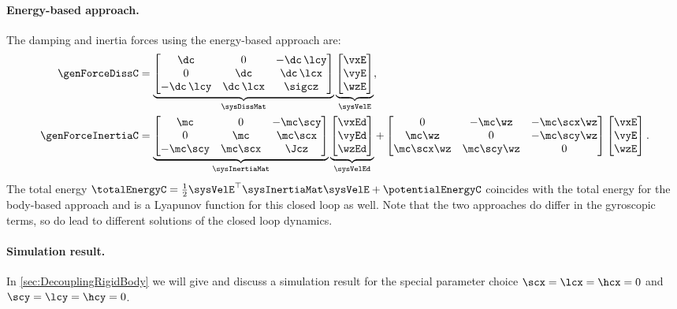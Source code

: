 \paragraph{Energy-based approach.}
The damping and inertia forces using the energy-based approach are:
\begin{subequations}
\begin{align}
 \genForceDissC &= \underbrace{\begin{bmatrix} \dc & 0 &-\dc\,\lcy \\ 0 & \dc & \dc\,\lcx \\ -\dc\,\lcy & \dc\,\lcx & \sigcz \end{bmatrix}}_{\sysDissMat}
 \underbrace{\begin{bmatrix} \vxE \\ \vyE \\ \wzE \end{bmatrix}}_{\sysVelE},
\\
 \genForceInertiaC &= \underbrace{\begin{bmatrix} \mc & 0 & -\mc\scy \\ 0 & \mc & \mc\scx \\ -\mc\scy & \mc\scx & \Jcz \end{bmatrix}}_{\sysInertiaMat}
 \underbrace{\begin{bmatrix} \vxEd \\ \vyEd \\ \wzEd \end{bmatrix}}_{\sysVelEd}
 + \begin{bmatrix} 0 & -\mc\wz & -\mc\scx\wz \\ \mc\wz & 0 & -\mc\scy\wz \\ \mc\scx\wz & \mc\scy\wz & 0 \end{bmatrix}
 \begin{bmatrix} \vxE \\ \vyE \\ \wzE \end{bmatrix}.
\end{align} 
\end{subequations}
The total energy $\totalEnergyC = \tfrac{1}{2} \sysVelE^\top \sysInertiaMat \sysVelE + \potentialEnergyC$ coincides with the total energy for the body-based approach and is a Lyapunov function for this closed loop as well.
Note that the two approaches do differ in the gyroscopic terms, so do lead to different solutions of the closed loop dynamics.

\paragraph{Simulation result.}
In \autoref{sec:DecouplingRigidBody} we will give and discuss a simulation result for the special parameter choice $\scx=\lcx=\hcx=0$ and $\scy=\lcy=\hcy=0$.

